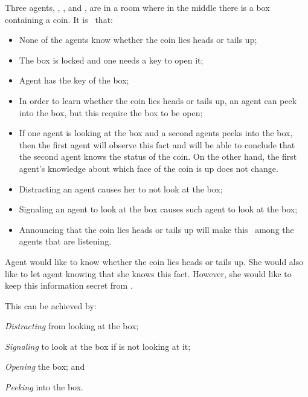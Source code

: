 \begin{example}\label{ex:coin_box}
	Three agents, , , and , are in a room where in the middle there
	is a box containing a coin. It is \ck\ that:
	\begin{itemize}
		\item None of the agents know whether the coin lies heads or tails up;
		\item The box is locked and one needs a key to open it;
		\item Agent  has the key of the box;
		\item In order to learn whether the coin lies heads or tails up, an agent
		  can peek into the box, but this require the box to be open;
		\item If one agent is looking at the box and a second agents peeks into
		  the box, then the first agent will observe this fact and will be able to
		  conclude that the second agent knows the status of the coin. On the other
		  hand, the first agent's knowledge about which face of the coin is up does
		  not change.
		\item Distracting an agent causes her to not look at the box;
		\item Signaling an agent to look at the box causes such agent to
		  look at the box;
		\item Announcing that the coin lies heads or tails up will make this
		  \ck\ among the agents that are listening.
	\end{itemize}

	Agent  would like to know whether the coin lies heads or tails up.
	She would also like to let agent  knowing that she knows this fact.
	However, she would like to keep this information secret from .
	
	This can be achieved by:
	\begin{enumerate*}[label=\roman*)]
		\item\emph{Distracting}  from looking at the box;
		\item\emph{Signaling}  to look at the box if  is not looking at it;
		\item\emph{Opening} the box; and
		\item\emph{Peeking} into the box.
	\end{enumerate*}


\end{example}
